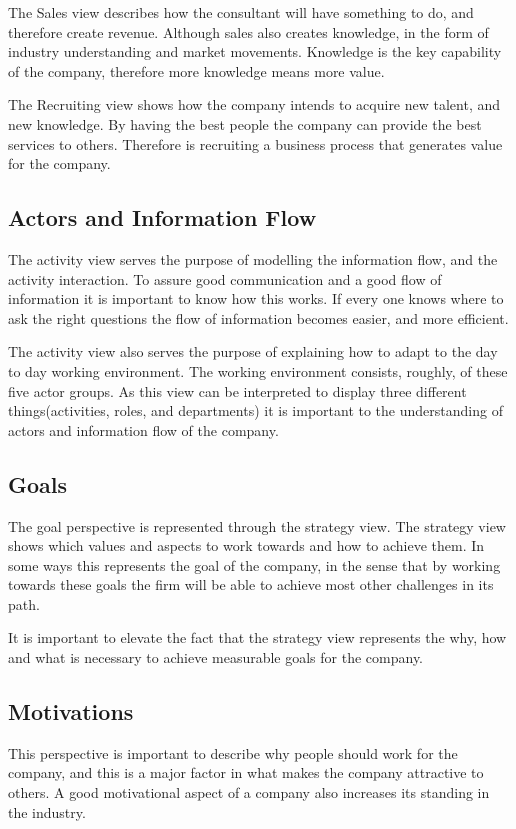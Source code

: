 \documentclass[12pt, a4paper]{article}
\begin{document}
The Sales view describes how the consultant will have something to do, and
therefore create revenue. Although sales also creates knowledge, in the form of
industry understanding and market movements. Knowledge is the key capability of
the company, therefore more knowledge means more value. 

The Recruiting view shows how the company intends to acquire new talent, and
new knowledge. By having the best people the company can provide the best
services to others. Therefore is recruiting a business process that generates
value for the company.  

\subsection{Actors and Information Flow}
The activity view serves the purpose of modelling the information flow, and the
activity interaction. To assure good communication and a good flow of
information it is important to know how this works. If every one knows where to
ask the right questions the flow of information becomes easier, and more
efficient.

The activity view also serves the purpose of explaining how to adapt to the
day to day working environment. The working environment consists, roughly, of
these five actor groups. As this view can be interpreted to display three
different things(activities, roles, and departments) it is important to the
understanding of actors and information flow of the company. 

\subsection{Goals}
The goal perspective is represented through the strategy view. The strategy
view shows which values and aspects to work towards and how to achieve them. In
some ways this represents the goal of the company, in the sense that by working
towards these goals the firm will be able to achieve most other challenges in
its path.

It is important to elevate the fact that the strategy view represents the why,
how and what is necessary to achieve measurable goals for the company.
 
\subsection{Motivations}
This perspective is important to describe why people should work for the
company, and this is a major factor in what makes the company attractive to
others. A good motivational aspect of a company also increases its standing in
the industry. 
\end{document}

